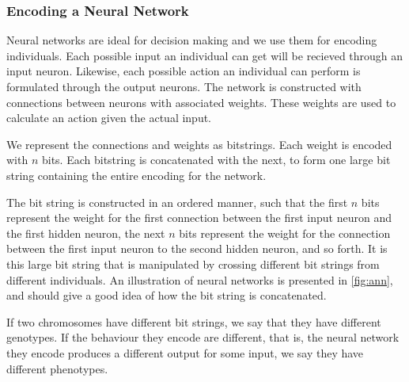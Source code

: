 \subsubsection{Encoding a Neural Network}

Neural networks are ideal for decision making and we use them for encoding individuals. Each possible input an individual can get will be recieved through an input neuron. Likewise, each possible action an individual can perform is formulated through the output neurons. The network is constructed with connections between neurons with associated weights. These weights are used to calculate an action given the actual input.

We represent the connections and weights as bitstrings. Each weight is encoded with $n$ bits. Each bitstring is concatenated with the next, to form one large bit string containing the entire encoding for the network.

The bit string is constructed in an ordered manner, such that the first $n$ bits represent the weight for the first connection between the first input neuron and the first hidden neuron, the next $n$ bits represent the weight for the connection between the first input neuron to the second hidden neuron, and so forth. It is this large bit string that is manipulated by crossing different bit strings from different individuals. An illustration of neural networks is presented in \cref{fig:ann}, and should give a good idea of how the bit string is concatenated.




If two chromosomes have different bit strings, we say that they have different genotypes. If the behaviour they encode are different, that is, the neural network they encode produces a different output for some input,  we say they have different phenotypes.
